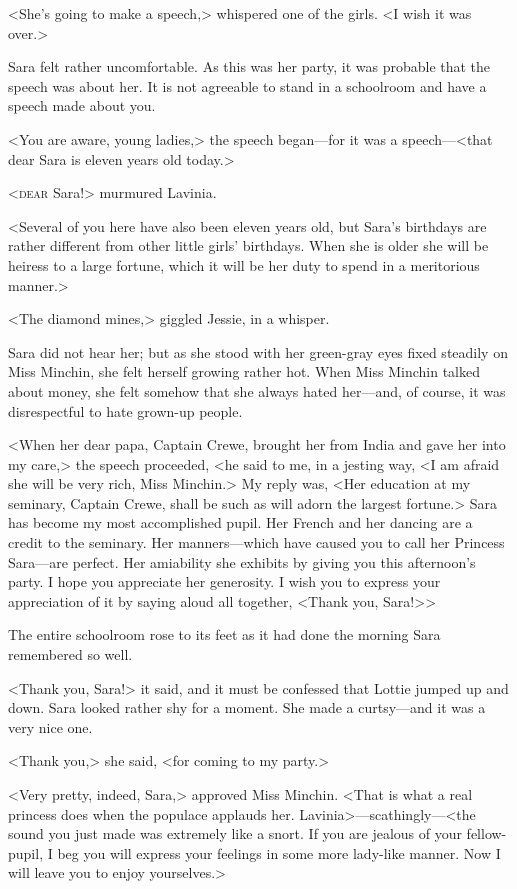 <She's going to make a speech,> whispered one of the girls. <I wish it was over.>

Sara felt rather uncomfortable. As this was her party, it was probable that the speech was about her. It is not agreeable to stand in a schoolroom and have a speech made about you.

<You are aware, young ladies,> the speech began—for it was a speech—<that dear Sara is eleven years old today.>

<\textsc{dear} Sara!> murmured Lavinia.

<Several of you here have also been eleven years old, but Sara's birthdays are rather different from other little girls' birthdays. When she is older she will be heiress to a large fortune, which it will be her duty to spend in a meritorious manner.>

<The diamond mines,> giggled Jessie, in a whisper.

Sara did not hear her; but as she stood with her green-gray eyes fixed steadily on Miss Minchin, she felt herself growing rather hot. When Miss Minchin talked about money, she felt somehow that she always hated her—and, of course, it was disrespectful to hate grown-up people.

<When her dear papa, Captain Crewe, brought her from India and gave her into my care,> the speech proceeded, <he said to me, in a jesting way, <I am afraid she will be very rich, Miss Minchin.> My reply was, <Her education at my seminary, Captain Crewe, shall be such as will adorn the largest fortune.> Sara has become my most accomplished pupil. Her French and her dancing are a credit to the seminary. Her manners—which have caused you to call her Princess Sara—are perfect. Her amiability she exhibits by giving you this afternoon's party. I hope you appreciate her generosity. I wish you to express your appreciation of it by saying aloud all together, <Thank you, Sara!>>

The entire schoolroom rose to its feet as it had done the morning Sara remembered so well.

<Thank you, Sara!> it said, and it must be confessed that Lottie jumped up and down. Sara looked rather shy for a moment. She made a curtsy—and it was a very nice one.

<Thank you,> she said, <for coming to my party.>

<Very pretty, indeed, Sara,> approved Miss Minchin. <That is what a real princess does when the populace applauds her. Lavinia>—scathingly—<the sound you just made was extremely like a snort. If you are jealous of your fellow-pupil, I beg you will express your feelings in some more lady-like manner. Now I will leave you to enjoy yourselves.>

